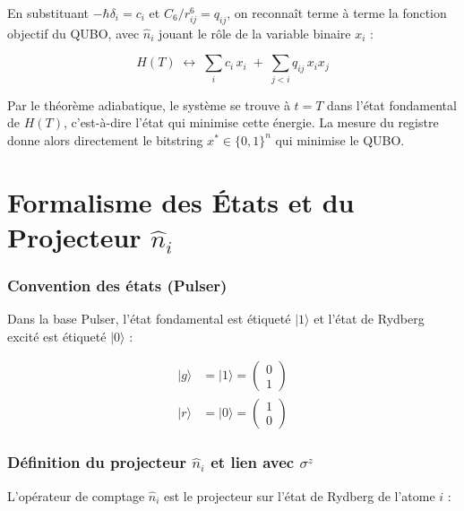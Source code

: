 \documentclass{ceri/sty/rapport}
\begin{document}
En substituant $-\hbar\delta_i = c_i$ et $C_6/r_{ij}^6 = q_{ij}$, on reconnaît terme à terme
la fonction objectif du QUBO, avec $\hat{n}_i$ jouant le rôle de la variable binaire $x_i$ :

\begin{equation}
H(T) \;\longleftrightarrow\; \sum_i c_i\,x_i \;+\; \sum_{j<i} q_{ij}\,x_i x_j
\end{equation}

Par le théorème adiabatique, le système se trouve à $t = T$ dans l'état fondamental de $H(T)$,
c'est-à-dire l'état qui minimise cette énergie. La mesure du registre donne alors directement
le bitstring $x^* \in \{0,1\}^n$ qui minimise le QUBO.



\appendix

\section{Formalisme des États et du Projecteur $\hat{n}_i$}
\label{ann:formalisme}

\subsubsection*{Convention des états (Pulser)}

Dans la base Pulser, l'état fondamental est étiqueté $|1\rangle$ et l'état de Rydberg excité est
étiqueté $|0\rangle$ :

\begin{align}
|g\rangle &= |1\rangle = \begin{pmatrix}0\\1\end{pmatrix} \\[4pt]
|r\rangle &= |0\rangle = \begin{pmatrix}1\\0\end{pmatrix}
\end{align}

\subsubsection*{Définition du projecteur $\hat{n}_i$ et lien avec $\sigma^z$}

L'opérateur de comptage $\hat{n}_i$ est le projecteur sur l'état de Rydberg de l'atome $i$ :
\end{document}

